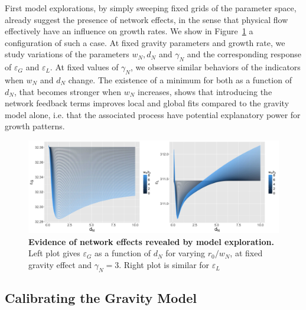 \documentclass[Royal,sageh,times]{sagej}
\begin{document}
First model explorations, by simply sweeping fixed grids of the parameter space, already suggest the presence of network effects, in the sense that physical flow effectively have an influence on growth rates. We show in Figure~\ref{fig:networkeffects} a configuration of such a case. At fixed gravity parameters and growth rate, we study variations of the parameters $w_N, d_N$ and $\gamma_N$ and the corresponding response of $\varepsilon_G$ and $\varepsilon_L$. At fixed values of $\gamma_N$, we observe similar behaviors of the indicators when $w_N$ and $d_N$ change. The existence of a minimum for both as a function of $d_N$, that becomes stronger when $w_N$ increases, shows that introducing the network feedback terms improves local and global fits compared to the gravity model alone, i.e. that the associated process have potential explanatory power for growth patterns.


\begin{figure}
\centering
\includegraphics[width=\textwidth]{figures/Fig3.jpg}
\caption{\textbf{Evidence of network effects revealed by model exploration.} Left plot gives $\varepsilon_G$ as a function of $d_N$ for varying $r_0/w_N$, at fixed gravity effect and $\gamma_N=3$. Right plot is similar for $\varepsilon_L$}
\label{fig:networkeffects}
\end{figure}





\subsection*{Calibrating the Gravity Model}
\end{document}
